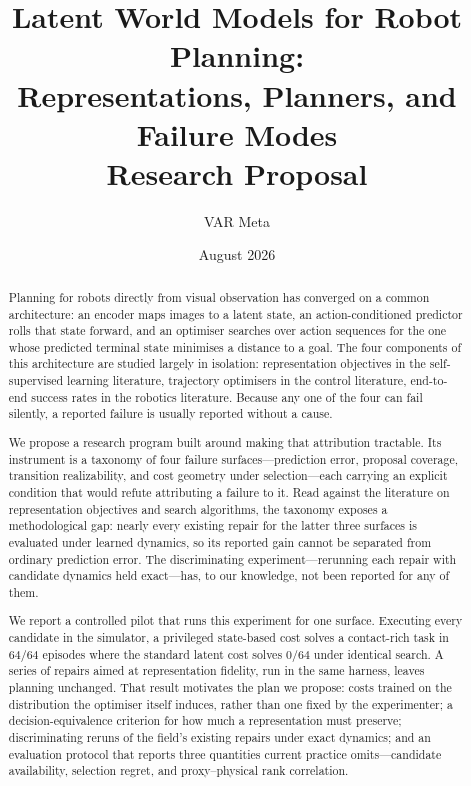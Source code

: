 \documentclass[11pt,letterpaper]{article}
\title{\textbf{Latent World Models for Robot Planning:}\\[2pt]
\textbf{Representations, Planners, and Failure Modes}\\[6pt]
\large Research Proposal}
\author{VAR Meta}
\date{August 2026}
\begin{document}
\maketitle

\begin{abstract}
\noindent
Planning for robots directly from visual observation has converged on a common
architecture: an encoder maps images to a latent state, an action-conditioned
predictor rolls that state forward, and an optimiser searches over action
sequences for the one whose predicted terminal state minimises a distance to a
goal. The four components of this architecture are studied largely in
isolation: representation objectives in the self-supervised learning
literature, trajectory optimisers in the control literature, end-to-end
success rates in the robotics literature. Because any one of the four can fail
silently, a reported failure is usually reported without a cause.

We propose a research program built around making that attribution tractable.
Its instrument is a taxonomy of four failure surfaces---prediction error,
proposal coverage, transition realizability, and cost geometry under
selection---each carrying an explicit condition that would refute attributing
a failure to it. Read against the literature on representation objectives and
search algorithms, the taxonomy exposes a methodological gap: nearly every
existing repair for the latter three surfaces is evaluated under learned
dynamics, so its reported gain cannot be separated from ordinary prediction
error. The discriminating experiment---rerunning each repair with candidate
dynamics held exact---has, to our knowledge, not been reported for any of
them.

We report a controlled pilot that runs this experiment for one surface.
Executing every candidate in the simulator, a privileged state-based cost
solves a contact-rich task in $64/64$ episodes where the standard latent cost
solves $0/64$ under identical search. A series of repairs aimed at
representation fidelity, run in the same harness, leaves planning unchanged.
That result motivates the plan we propose: costs trained on the distribution
the optimiser itself induces, rather than one fixed by the experimenter; a
decision-equivalence criterion for how much a representation must preserve;
discriminating reruns of the field's existing repairs under exact dynamics;
and an evaluation protocol that reports three quantities current practice
omits---candidate availability, selection regret, and proxy--physical rank
correlation.
\end{abstract}
\end{document}
